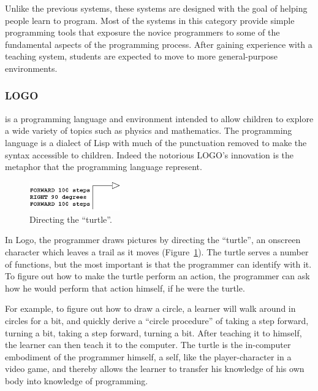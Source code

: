 Unlike the previous systems, these systems are designed with the goal of helping people learn to program. Most of the systems in this category provide simple programming tools that exposure the novice programmers to some of the fundamental aspects of the programming process. After gaining experience with a teaching system, students are expected to move to more general-purpose environments. 

\subsubsection{LOGO~\cite{papert1980mindstorms}} is a programming language and environment intended to allow children to explore a wide variety of topics such as physics and mathematics. The programming language is a dialect of Lisp with much of the punctuation removed to make the syntax accessible to children. Indeed the notorious LOGO's innovation is the metaphor that the programming language represent.

\begin{figure}
  \vspace{-15pt}
  \begin{center}
    \includegraphics[width=0.35\textwidth]{img/turtle}
  \end{center}
  \vspace{-20pt}
 \caption{Directing the ``turtle''.}  
  \vspace{-20pt}
    \label{fig:turtle}
\end{figure}

In Logo, the programmer draws pictures by directing the ``turtle'', an onscreen character which leaves a trail as it moves (Figure~\ref{fig:turtle}). The turtle serves a number of functions, but the most important is that the programmer can identify with it. To figure out how to make the turtle perform an action, the programmer can ask how he would perform that action himself, if he were the turtle.

For example, to figure out how to draw a circle, a learner will walk around in circles for a bit, and quickly derive a ``circle procedure'' of taking a step forward, turning a bit, taking a step forward, turning a bit. After teaching it to himself, the learner can then teach it to the computer. The turtle is the in-computer embodiment of the programmer himself, a self, like the player-character in a video game, and thereby allows the learner to 
transfer his knowledge of his own body into knowledge of programming.

